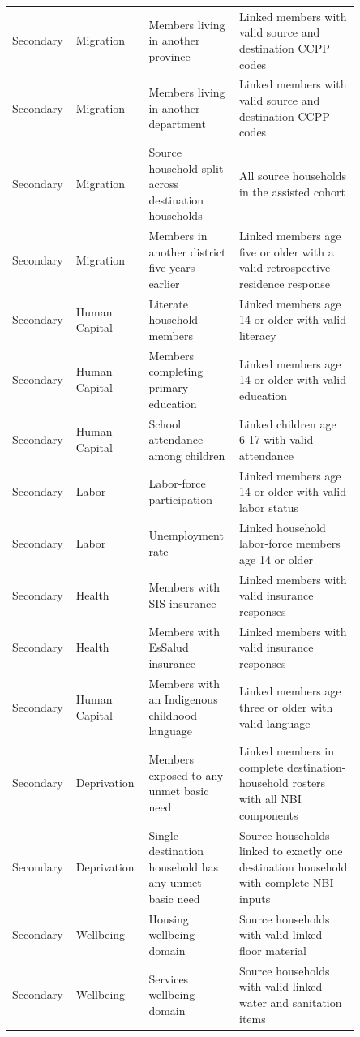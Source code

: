 \begin{longtable}{p{0.10\linewidth}p{0.18\linewidth}p{0.24\linewidth}p{0.33\linewidth}}
Secondary & Migration & Members living in another province & Linked members with valid source and destination CCPP codes \\
Secondary & Migration & Members living in another department & Linked members with valid source and destination CCPP codes \\
Secondary & Migration & Source household split across destination households & All source households in the assisted cohort \\
Secondary & Migration & Members in another district five years earlier & Linked members age five or older with a valid retrospective residence response \\
Secondary & Human Capital & Literate household members & Linked members age 14 or older with valid literacy \\
Secondary & Human Capital & Members completing primary education & Linked members age 14 or older with valid education \\
Secondary & Human Capital & School attendance among children & Linked children age 6-17 with valid attendance \\
Secondary & Labor & Labor-force participation & Linked members age 14 or older with valid labor status \\
Secondary & Labor & Unemployment rate & Linked household labor-force members age 14 or older \\
Secondary & Health & Members with SIS insurance & Linked members with valid insurance responses \\
Secondary & Health & Members with EsSalud insurance & Linked members with valid insurance responses \\
Secondary & Human Capital & Members with an Indigenous childhood language & Linked members age three or older with valid language \\
Secondary & Deprivation & Members exposed to any unmet basic need & Linked members in complete destination-household rosters with all NBI components \\
Secondary & Deprivation & Single-destination household has any unmet basic need & Source households linked to exactly one destination household with complete NBI inputs \\
Secondary & Wellbeing & Housing wellbeing domain & Source households with valid linked floor material \\
Secondary & Wellbeing & Services wellbeing domain & Source households with valid linked water and sanitation items \\

\end{longtable}
